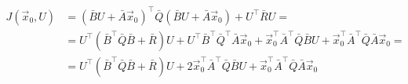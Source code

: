 \documentclass{article}
\begin{document}
\thispagestyle{empty}

\begin{align*}
J(\vec{x}_0, U) & = (\bar{B}U + \bar{A}\vec{x}_0)^\top\bar{Q}(\bar{B}U + \bar{A}\vec{x}_0)+U^\top\bar{R}U=\\
& = U^\top(\bar{B}^\top\bar{Q}\bar{B} + \bar{R})U + U^\top \bar{B}^\top \bar{Q}^\top \bar{A}\vec{x}_0 + \vec{x}_0^\top \bar{A}^\top \bar{Q} \bar{B} U + \vec{x}_0^\top \bar{A}^\top \bar{Q} \bar{A} \vec{x}_0 = \\
& = U^\top(\bar{B}^\top\bar{Q}\bar{B} + \bar{R})U + 2 \vec{x}_0^\top \bar{A}^\top \bar{Q} \bar{B} U + \vec{x}_0^\top \bar{A}^\top \bar{Q} \bar{A} \vec{x}_0 
\end{align*}
\end{document}
